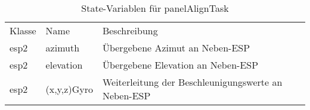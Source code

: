 \begin{table}[H]
    \begin{center}
        \begin{tabular}{|l|l|l|}
            \hline
            Klasse & Name                  & Beschreibung                                        \\
            \Xhline{3\arrayrulewidth}
            esp2 & azimuth        & Übergebene Azimut an Neben-ESP                               \\
            \hline
            esp2 & elevation      & Übergebene Elevation an Neben-ESP                            \\
            \hline
            esp2 & (x,y,z)Gyro           & Weiterleitung der Beschleunigungswerte an Neben-ESP   \\
            \hline
        \end{tabular}
        \caption{State-Variablen für panelAlignTask}
        \label{tableStatePanelAlign}
    \end{center}
\end{table}





